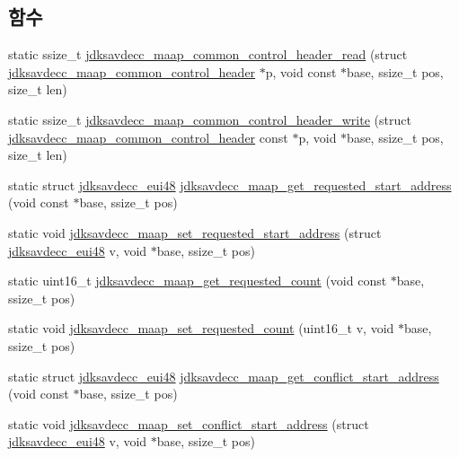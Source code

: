 \subsection*{함수}
\begin{DoxyCompactItemize}
\item 
static ssize\+\_\+t \hyperlink{group__maap_ga8996877577f51c77eea7402da4d29a66}{jdksavdecc\+\_\+maap\+\_\+common\+\_\+control\+\_\+header\+\_\+read} (struct \hyperlink{structjdksavdecc__maap__common__control__header}{jdksavdecc\+\_\+maap\+\_\+common\+\_\+control\+\_\+header} $\ast$p, void const $\ast$base, ssize\+\_\+t pos, size\+\_\+t len)
\item 
static ssize\+\_\+t \hyperlink{group__maap_gab7754abbc6810e8f62fcaf117dd7de5d}{jdksavdecc\+\_\+maap\+\_\+common\+\_\+control\+\_\+header\+\_\+write} (struct \hyperlink{structjdksavdecc__maap__common__control__header}{jdksavdecc\+\_\+maap\+\_\+common\+\_\+control\+\_\+header} const $\ast$p, void $\ast$base, ssize\+\_\+t pos, size\+\_\+t len)
\item 
static struct \hyperlink{structjdksavdecc__eui48}{jdksavdecc\+\_\+eui48} \hyperlink{group__maap_gaae4ba6d9f12fa49106ae74c0148dc33d}{jdksavdecc\+\_\+maap\+\_\+get\+\_\+requested\+\_\+start\+\_\+address} (void const $\ast$base, ssize\+\_\+t pos)
\item 
static void \hyperlink{group__maap_ga3b8b59a0014a0e87cc1af82123bfdf1e}{jdksavdecc\+\_\+maap\+\_\+set\+\_\+requested\+\_\+start\+\_\+address} (struct \hyperlink{structjdksavdecc__eui48}{jdksavdecc\+\_\+eui48} v, void $\ast$base, ssize\+\_\+t pos)
\item 
static uint16\+\_\+t \hyperlink{group__maap_ga5fe709a6899411d9c88706a26b7afc2e}{jdksavdecc\+\_\+maap\+\_\+get\+\_\+requested\+\_\+count} (void const $\ast$base, ssize\+\_\+t pos)
\item 
static void \hyperlink{group__maap_ga852cae235a6f5f817c069d2e187da081}{jdksavdecc\+\_\+maap\+\_\+set\+\_\+requested\+\_\+count} (uint16\+\_\+t v, void $\ast$base, ssize\+\_\+t pos)
\item 
static struct \hyperlink{structjdksavdecc__eui48}{jdksavdecc\+\_\+eui48} \hyperlink{group__maap_gad3974960a03d497ccfa9f8e966480aa7}{jdksavdecc\+\_\+maap\+\_\+get\+\_\+conflict\+\_\+start\+\_\+address} (void const $\ast$base, ssize\+\_\+t pos)
\item 
static void \hyperlink{group__maap_gab2464cd4c7723dc065be692feca2f85b}{jdksavdecc\+\_\+maap\+\_\+set\+\_\+conflict\+\_\+start\+\_\+address} (struct \hyperlink{structjdksavdecc__eui48}{jdksavdecc\+\_\+eui48} v, void $\ast$base, ssize\+\_\+t pos)

\end{DoxyCompactItemize}
